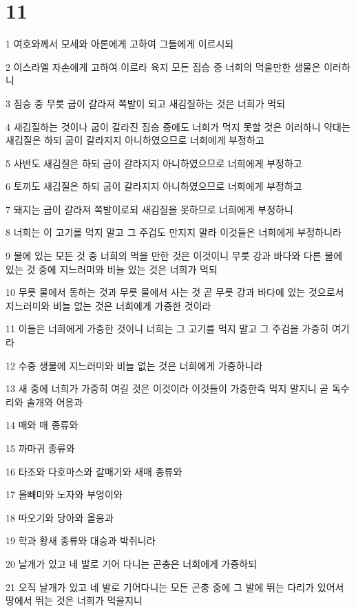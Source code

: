 \chapter{11}

\par 1 여호와께서 모세와 아론에게 고하여 그들에게 이르시되
\par 2 이스라엘 자손에게 고하여 이르라 육지 모든 짐승 중 너희의 먹을만한 생물은 이러하니
\par 3 짐승 중 무릇 굽이 갈라져 쪽발이 되고 새김질하는 것은 너희가 먹되
\par 4 새김질하는 것이나 굽이 갈라진 짐승 중에도 너희가 먹지 못할 것은 이러하니 약대는 새김질은 하되 굽이 갈라지지 아니하였으므로 너희에게 부정하고
\par 5 사반도 새김질은 하되 굽이 갈라지지 아니하였으므로 너희에게 부정하고
\par 6 토끼도 새김질은 하되 굽이 갈라지지 아니하였으므로 너희에게 부정하고
\par 7 돼지는 굽이 갈라져 쪽발이로되 새김질을 못하므로 너희에게 부정하니
\par 8 너희는 이 고기를 먹지 말고 그 주검도 만지지 말라 이것들은 너희에게 부정하니라
\par 9 물에 있는 모든 것 중 너희의 먹을 만한 것은 이것이니 무릇 강과 바다와 다른 물에 있는 것 중에 지느러미와 비늘 있는 것은 너희가 먹되
\par 10 무릇 물에서 동하는 것과 무릇 물에서 사는 것 곧 무릇 강과 바다에 있는 것으로서 지느러미와 비늘 없는 것은 너희에게 가증한 것이라
\par 11 이들은 너희에게 가증한 것이니 너희는 그 고기를 먹지 말고 그 주검을 가증히 여기라
\par 12 수중 생물에 지느러미와 비늘 없는 것은 너희에게 가증하니라
\par 13 새 중에 너희가 가증히 여길 것은 이것이라 이것들이 가증한즉 먹지 말지니 곧 독수리와 솔개와 어응과
\par 14 매와 매 종류와
\par 15 까마귀 종류와
\par 16 타조와 다호마스와 갈매기와 새매 종류와
\par 17 올빼미와 노자와 부엉이와
\par 18 따오기와 당아와 올응과
\par 19 학과 황새 종류와 대승과 박쥐니라
\par 20 날개가 있고 네 발로 기어 다니는 곤충은 너희에게 가증하되
\par 21 오직 날개가 있고 네 발로 기어다니는 모든 곤충 중에 그 발에 뛰는 다리가 있어서 땅에서 뛰는 것은 너희가 먹을지니
